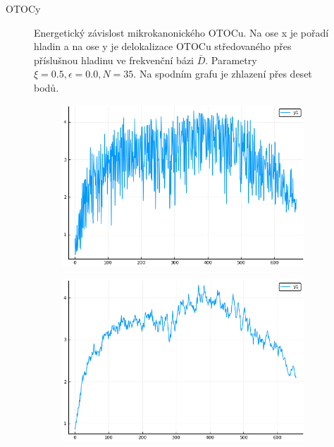 \documentclass{article}
\begin{document}
\begin{section}{OTOCy}
\begin{figure}[H]
\begin{subfigure}{.5\textwidth}
        \end{subfigure}
        \caption{Energetický závislost mikrokanonického OTOCu. Na ose x je pořadí hladin a na ose y je delokalizace OTOCu středovaného
        přes příslušnou hladinu ve frekvenční bázi $\bar{D}$. Parametry $\xi = 0.5, \epsilon = 0.0, N =35$. Na spodním grafu je zhlazení 
        přes deset bodů.}
        \end{figure}


        \begin{figure}[H]
            \centering
            \begin{subfigure}{.5\textwidth}
              \centering
              \includegraphics[width=1.0\linewidth]{Escale0.25.png}
    
            \end{subfigure}%
    
            \begin{subfigure}{.5\textwidth}
              \centering
              \includegraphics[width=1.0\linewidth]{Escale0.25smooth.png}
    

\end{subfigure}
\end{figure}
\end{section}
\end{document}
